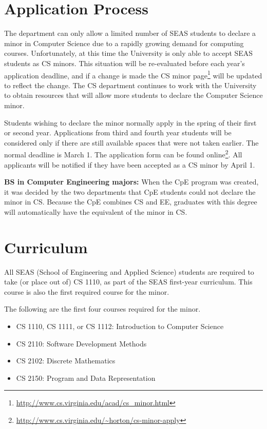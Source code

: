 \documentclass[10pt,letter,twocolumn]{book}
\newenvironment{itemlist}{
\begin{itemize}
\setlength{\itemsep}{0pt}
\setlength{\parskip}{0pt}}
{\end{itemize}}
\newcommand{\mysection}[1]{\section{#1}\renewcommand{\rightmark}{#1}}
\newcommand{\myurl}[1]{\footnote{\scriptsize\url{#1}}}
\begin{document}
 
\mysection{Application Process}
\label{minorapplicationprocess}

The department can only allow a limited number of SEAS students to
declare a minor in Computer Science due to a rapidly growing demand
for computing courses.  Unfortunately, at this time the University is
only able to accept SEAS students as CS minors. This situation will be
re-evaluated before each year's application deadline, and if a change
is made the CS minor
page\myurl{http://www.cs.virginia.edu/acad/cs_minor.html} will be
updated to reflect the change. The CS department continues to work
with the University to obtain resources that will allow more students
to declare the Computer Science minor.

Students wishing to declare the minor normally apply in the spring of
their first or second year. Applications from third and fourth year
students will be considered only if there are still available spaces
that were not taken earlier. The normal deadline is March 1. The
application form can be found
online\myurl{http://www.cs.virginia.edu/~horton/cs-minor-apply}.  All
applicants will be notified if they have been accepted as a CS minor
by April 1.

{\bf BS in Computer Engineering majors:} When the CpE program was created,
it was decided by the two departments that CpE students could not
declare the minor in CS. Because the CpE combines CS and EE, graduates
with this degree will automatically have the equivalent of the minor
in CS.

\mysection{Curriculum}

All SEAS (School of Engineering and Applied Science) students are
required to take (or place out of) CS 1110, as part of the SEAS
first-year curriculum. This course is also the first required course
for the minor.

The following are the first four courses required for the minor.

\begin{itemlist} 
\item CS 1110, CS 1111, or CS 1112: Introduction
  to Computer Science
\item CS 2110: Software Development Methods
\item CS 2102: Discrete Mathematics
\item CS 2150: Program and Data Representation
\end{itemlist}
\end{document}
